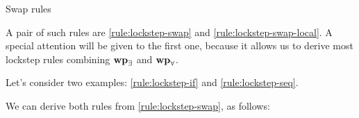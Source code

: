 \begin{mathfig}{\small}
    \begin{proofrules}        
        
        \label{rule:lockstep-swap}

        
        \label{rule:lockstep-swap-local}
    \end{proofrules}
    \caption{Swap rules}
\end{mathfig}

A pair of such rules are \cref{rule:lockstep-swap} and \cref{rule:lockstep-swap-local}. A special attention will be given to the first one, because it allows us to derive most lockstep rules combining $\wpsymb_{\exists}$ and $\wpsymb_{\forall}$.

Let's consider two examples: \cref{rule:lockstep-if} and \cref{rule:lockstep-seq}.

\resizebox{0.8\width}{!}{
\begin{proofrules}
    
    \label{rule:lockstep-seq}

    
    \label{rule:lockstep-if}
\end{proofrules}
}

\bigskip

We can derive both rules from \cref{rule:lockstep-swap}, as follows:

\bigskip

\begin{prooftree}
\end{prooftree}

\bigskip


